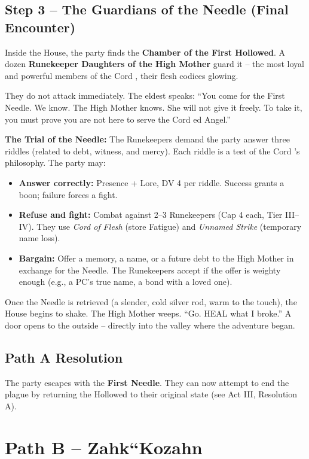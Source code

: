 \documentclass[10pt,twoside]{book}
\begin{document}
\subsection{Step 3 -- The Guardians of the Needle (Final Encounter)}
Inside the House, the party finds the \textbf{Chamber of the First Hollowed}. A dozen \textbf{Runekeeper Daughters of the High Mother} guard it -- the most loyal and powerful members of the Cord , their flesh codices glowing.

They do not attack immediately. The eldest speaks: ``You come for the First Needle. We know. The High Mother knows. She will not give it freely. To take it, you must prove you are not here to serve the Cord ed Angel.''

\textbf{The Trial of the Needle:}
The Runekeepers demand the party answer three riddles (related to debt, witness, and mercy). Each riddle is a test of the Cord 's philosophy. The party may:
\begin{itemize}
\item \textbf{Answer correctly:} Presence + Lore, DV 4 per riddle. Success grants a boon; failure forces a fight.
\item \textbf{Refuse and fight:} Combat against 2--3 Runekeepers (Cap 4 each, Tier III--IV). They use \textit{Cord of Flesh} (store Fatigue) and \textit{Unnamed Strike} (temporary name loss).
\item \textbf{Bargain:} Offer a memory, a name, or a future debt to the High Mother in exchange for the Needle. The Runekeepers accept if the offer is weighty enough (e.g., a PC's true name, a bond with a loved one).
\end{itemize}

Once the Needle is retrieved (a slender, cold silver rod, warm to the touch), the House begins to shake. The High Mother weeps. ``Go. HEAL what I broke.'' A door opens to the outside -- directly into the valley where the adventure began.

\subsection{Path A Resolution}
The party escapes with the \textbf{First Needle}. They can now attempt to end the plague by returning the Hollowed to their original state (see Act III, Resolution A).

\section{Path B -- Zahk``Kozahn}
\end{document}
